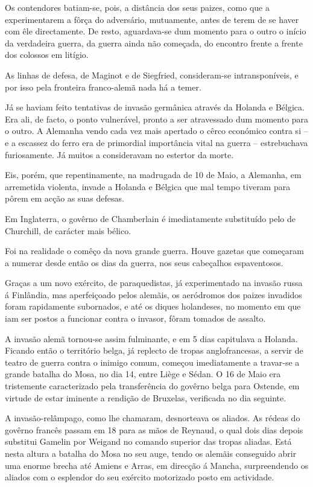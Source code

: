 \documentclass[9pt]{article}
\begin{document}
Os contendores batiam-se, pois, a distância dos seus paizes, como que
a experimentarem a fôrça do adversário, mutuamente, antes de terem de se
haver com êle directamente. De resto, aguardava-se dum momento para o outro o início da verdadeira guerra, da guerra ainda não começada, do encontro frente a frente dos colossos em litígio.

As linhas de defesa, de Maginot e de Siegfried, consideram-se intransponíveis, e por isso pela fronteira franco-alemã nada há a temer.

Já se haviam feito tentativas de invasão germânica através da Holanda e Bélgica. Era ali, de facto, o ponto vulnerável, pronto a ser atravessado dum momento para o outro. A Alemanha vendo cada vez mais apertado
o cêrco económico contra si -- e a escassez do ferro era de primordial importância vital na guerra -- estrebuchava furiosamente. Já muitos a consideravam no estertor da morte.

Eis, porém, que repentinamente, na madrugada de 10 de Maio, a Alemanha,
em arremetida violenta, invade a Holanda e Bélgica que  mal tempo tiveram para pôrem em ac\-ção as suas defesas.

Em Inglaterra, o govêrno de Chamberlain é imediatamente substituído
pelo de Churchill, de carácter mais bélico.

Foi na realidade o comêço da nova gran\-de guerra. Houve gazetas que
começaram a numerar desde então os dias da guerra, nos seus cabeça\-lhos
espaventosos.

Graças a um novo exército, de paraquedistas, já experimentado na invasão russa á Finlândia, mas aperfeiçoado pelos alemãis, os aeródro\-mos
dos paizes invadidos foram rapidamente subornados, e até os diques holandeses, no momento em que iam ser postos a funcionar contra o invasor, fôram tomados de assalto.

A invasão alemã tornou-se assim fulminante, e em 5 dias capitulava
a Holanda. Ficando então o território belga, já replecto de tropas anglofrancesas, a servir de teatro de guerra contra o inimigo comum, começou
imediatamente a travar-se a gran\-de bata\-lha do Mosa, no dia 14, entre Liège
e Sédan. O 16 de Maio era tristemente ca\-ra\-cte\-ri\-zado pela transferência
do govêrno belga para Ostende, em virtude de estar iminente a rendi\-ção
de Bruxelas, verifi\-cada no dia seguinte.

A invasão-relâmpago, como lhe chamaram, desnorteava os aliados. As
rédeas do govêrno francês passam em 18 para as mãos de Reynaud, o qual
dois dias depois substitui Gamelin por Weigand no comando superior das
tropas aliadas. Está nesta altura a bata\-lha do Mosa no seu auge, tendo os
alemãis conseguido abrir uma enorme brecha até Amiens e Arras, em direc\-ção á Mancha, surpreendendo os aliados com o esplendor do seu exército
motorizado posto em actividade.
\end{document}
